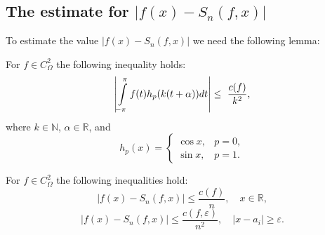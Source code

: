 \subsection{The estimate for $\left|f(x)-S_{n}(f,x)\right|$}
To estimate the value $\left|f(x)-S_{n}(f,x)\right|$ we need the following lemma:
\begin{lemma} \label{l_int_estimate}
	For $f \in C_\Omega^2$ the following inequality holds:
	\begin{equation*}
	\left|\intop_{-\pi}^{\pi}f(t)h_{p}(k(t+\alpha))dt\right|\leq\ \frac{c(f)}{k^{2}},
	\end{equation*}
	where $k \in \mathbb{N}$, $\alpha \in \mathbb{R}$, and
	\begin{equation} \label{h_func_introduction}
	h_{p}(x)=\begin{cases}
	\cos x, & p=0,\\
	\sin x, & p=1.
	\end{cases}
	\end{equation}
\end{lemma}
\begin{lemma}
	For $f \in C^2_\Omega$ the following inequalities hold:
	\begin{equation}
	\left|f(x)-S_{n}(f,x)\right|\leq\frac{c(f)}{n},\quad x\in\mathbb{R},\label{eq:fSn_est1}
	\end{equation}
	\begin{equation}
	\left|f(x)-S_{n}(f,x)\right|\leq\frac{c(f,\varepsilon)}{n^{2}},\quad\left|x-a_{i}\right|\geq\varepsilon.\label{eq:fSn_est2}
	\end{equation}
\end{lemma}
